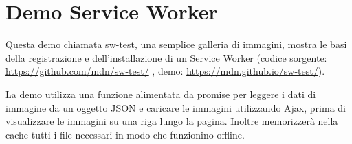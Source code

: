 \documentclass[italian]{article}
\begin{document}
\section{Demo Service Worker}
Questa demo chiamata sw-test, una semplice galleria di immagini, mostra le basi della registrazione e dell'installazione di un Service Worker (codice sorgente: \url{https://github.com/mdn/sw-test/} , demo: \url{https://mdn.github.io/sw-test/}). 

La demo utilizza una funzione alimentata da promise per leggere i dati di immagine da un oggetto JSON e caricare le immagini utilizzando Ajax, prima di visualizzare le immagini su una riga lungo la pagina. Inoltre memorizzerà nella cache tutti i file necessari in modo che funzionino offline.
\end{document}
